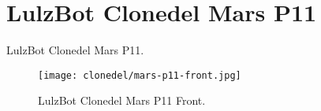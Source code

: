 %
%
%
%
%

\section{LulzBot Clonedel Mars P11}
LulzBot Clonedel Mars P11.

\begin{figure}[h!]
\texttt{[image: clonedel/mars-p11-front.jpg]}
 \caption{LulzBot Clonedel Mars P11 Front.}
 \label{fig:clonedel-mars-p11-front}
\end{figure}


